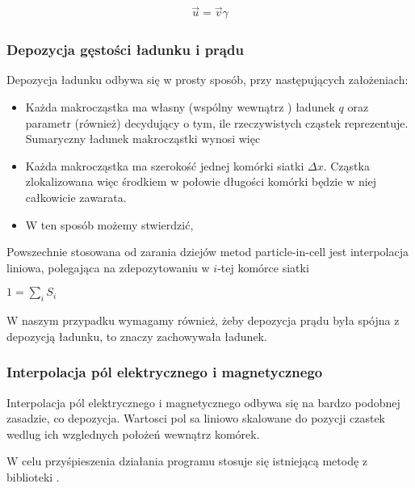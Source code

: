     \begin{align}
        \vec{u} = \vec{v} \gamma
        \label{eqn:gamma-transformation}
    \end{align}
    \subsubsection{Depozycja gęstości ładunku i prądu} 
    Depozycja ładunku odbywa się w prosty sposób, przy następujących założeniach:
    \begin{itemize}
        \item Każda makrocząstka ma własny (wspólny wewnątrz ) ładunek $q$ oraz parametr  (również) 
            decydujący o tym, ile rzeczywistych cząstek reprezentuje. Sumaryczny ładunek makrocząstki wynosi więc 
        \item Każda makrocząstka ma szerokość jednej komórki siatki $\Delta x$. Cząstka zlokalizowana więc środkiem
            w połowie długości komórki będzie w niej całkowicie zawarata.
        \item W ten sposób możemy stwierdzić, 
    \end{itemize}

    Powszechnie stosowana od zarania dziejów metod particle-in-cell 
    jest interpolacja liniowa, polegająca na zdepozytowaniu w $i$-tej komórce siatki 

    $1 = \sum_i S_i$ 

    W naszym przypadku wymagamy również, żeby depozycja prądu była spójna z depozycją ładunku, to znaczy
    zachowywała ładunek.

    \subsubsection{Interpolacja pól elektrycznego i magnetycznego}
    Interpolacja pól elektrycznego i magnetycznego odbywa się na bardzo podobnej zasadzie, co depozycja.
    Wartosci pol sa liniowo skalowane do pozycji czastek wedlug ich wzglednych położeń wewnątrz komórek.

    W celu przyśpieszenia działania programu stosuje się istniejącą metodę
     z biblioteki . 
